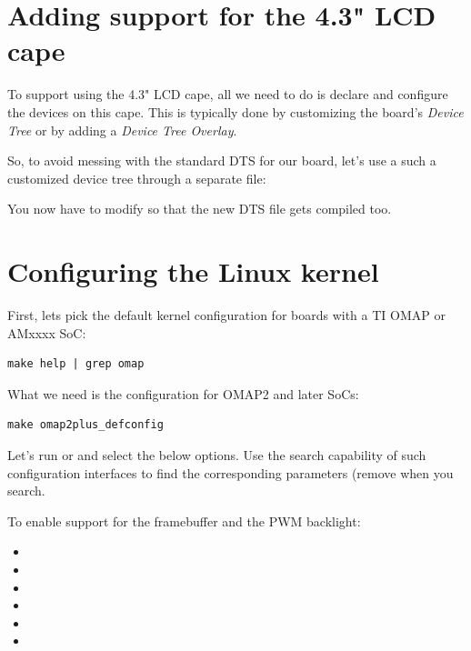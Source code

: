 \section{Adding support for the 4.3" LCD cape}

To support using the 4.3" LCD cape, all we need to do is declare and
configure the devices on this cape. This is typically done by
customizing the board's {\em Device Tree} or by adding a {\em Device
Tree Overlay}.

So, to avoid messing with the standard DTS for our board, let's use a
such a customized device tree through a separate file:


You now have to modify  so that
the new DTS file gets compiled too.

\section{Configuring the Linux kernel}

First, lets pick the default kernel configuration for boards with a TI
OMAP or AMxxxx SoC:

\begin{verbatim}
make help | grep omap
\end{verbatim}

What we need is the configuration for OMAP2 and later SoCs:
\begin{verbatim}
make omap2plus_defconfig
\end{verbatim}

Let's run  or  and select the
below options. Use the search capability of such configuration
interfaces to find the corresponding parameters (remove 
when you search.

To enable support for the framebuffer and the PWM backlight:
\begin{itemize}
\item {}
\item {}
\item {}
\item {}
\item {}
\item {}
\end{itemize}

